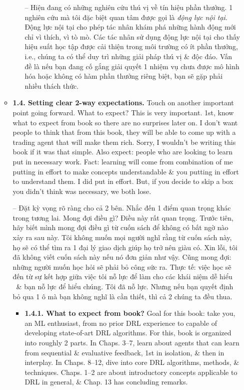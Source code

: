 \documentclass{article}
\begin{document}
\begin{itemize}
\begin{itemize}
\begin{itemize}
            -- Hiện đang có những nghiên cứu thú vị về tín hiệu phần thưởng. 1 nghiên cứu mà tôi đặc biệt quan tâm được gọi là {\it động lực nội tại}. Động lực nội tại cho phép tác nhân khám phá những hành động mới chỉ vì thích, vì tò mò. Các tác nhân sử dụng động lực nội tại cho thấy hiệu suất học tập được cải thiện trong môi trường có ít phần thưởng, i.e., chúng ta có thể duy trì những giải pháp thú vị \& độc đáo. Vấn đề là nếu bạn đang cố gắng giải quyết 1 nhiệm vụ chưa được mô hình hóa hoặc không có hàm phần thưởng riêng biệt, bạn sẽ gặp phải nhiều thách thức.
        \end{itemize}
        \item {\bf1.4. Setting clear 2-way expectations.} Touch on another important point going forward. What to expect? This is very important. 1st, know what to expect from book so there are no surprises later on. I don't want people to think that from this book, they will be able to come up with a trading agent that will make them rich. Sorry, I wouldn't be writing this book if it was that simple. Also expect: people who are looking to learn put in necessary work. Fact: learning will come from combination of me putting in effort to make concepts understandable \& you putting in effort to understand them. I did put in effort. But, if you decide to skip a box you didn't think was necessary, we both lose.

        -- {\sf Đặt kỳ vọng rõ ràng cho cả 2 bên.} Nhắc đến 1 điểm quan trọng khác trong tương lai. Mong đợi điều gì? Điều này rất quan trọng. Trước tiên, hãy biết mình mong đợi điều gì từ cuốn sách để không có bất ngờ nào xảy ra sau này. Tôi không muốn mọi người nghĩ rằng từ cuốn sách này, họ sẽ có thể tìm ra 1 đại lý giao dịch giúp họ trở nên giàu có. Xin lỗi, tôi đã không viết cuốn sách này nếu nó đơn giản như vậy. Cũng mong đợi: những người muốn học hỏi sẽ phải bỏ công sức ra. Thực tế: việc học sẽ đến từ sự kết hợp giữa việc tôi nỗ lực để làm cho các khái niệm dễ hiểu \ \& bạn nỗ lực để hiểu chúng. Tôi đã nỗ lực. Nhưng nếu bạn quyết định bỏ qua 1 ô mà bạn không nghĩ là cần thiết, thì cả 2 chúng ta đều thua.
        \begin{itemize}
            \item {\bf1.4.1. What to expect from book?} Goal for this book: take you, an ML enthusiast, from no prior DRL experience to capable of developing state-of-art DRL algorithms. For this, book is organized into roughly 2 parts. In Chaps. 3--7, learn about agents that can learn from sequential \& evaluative feedback, 1st in isolation, \& then in interplay. In Chaps. 8--12, dive into core DRL algorithms, methods, \& techniques. Chaps. 1--2 are about introductory concepts applicable to DRL in general, \& Chap. 13 has concluding remarks.


\end{itemize}
\end{itemize}
\end{itemize}
\end{document}
